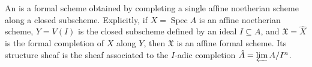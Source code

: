 An  is a formal scheme obtained by completing a single affine noetherian scheme along a closed subscheme. Explicitly, if $X = \operatorname{Spec} A$ is an affine noetherian scheme, $Y = V(I)$ is the closed subscheme defined by an ideal $I \subseteq A$, and $\mathfrak{X} = \hat{X}$ is the formal completion of $X$ along $Y$, then $\mathfrak{X}$ is an affine formal scheme. Its structure sheaf is the sheaf associated to the $I$-adic completion $\hat{A} = \varprojlim A/I^n$.
